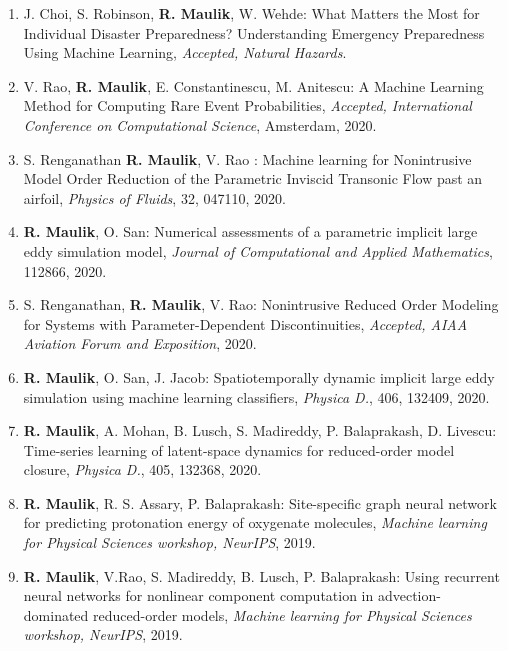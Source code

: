 \documentclass[letterpaper]{article}
\begin{document}
\begin{enumerate}

\item J. Choi, S. Robinson, \textbf{R. Maulik}, W. Wehde: What Matters the Most for Individual Disaster Preparedness? Understanding Emergency Preparedness Using Machine Learning, {\it Accepted, Natural Hazards}.

\item V. Rao, \textbf{R. Maulik}, E. Constantinescu, M. Anitescu: A Machine Learning Method for Computing Rare Event Probabilities, {\it Accepted, International Conference on Computational Science}, Amsterdam, 2020.

\item S. Renganathan \textbf{R. Maulik}, V. Rao : Machine learning for Nonintrusive Model Order Reduction of the Parametric Inviscid Transonic Flow past an airfoil, {\it Physics of Fluids}, 32, 047110, 2020.

\item \textbf{R. Maulik}, O. San: Numerical assessments of a parametric implicit large eddy simulation model, {\it Journal of Computational and Applied Mathematics}, 112866, 2020.

\item S. Renganathan, \textbf{R. Maulik}, V. Rao: Nonintrusive Reduced Order Modeling for Systems with Parameter-Dependent Discontinuities, {\it Accepted, AIAA Aviation Forum and Exposition}, 2020.

\item \textbf{R. Maulik}, O. San, J. Jacob: Spatiotemporally dynamic implicit large eddy simulation using machine learning classifiers, {\it Physica D.}, 406, 132409, 2020.

\item \textbf{R. Maulik}, A. Mohan, B. Lusch, S. Madireddy, P. Balaprakash, D. Livescu: Time-series learning of latent-space dynamics for reduced-order model closure, {\it Physica D.}, 405, 132368, 2020.

\item \textbf{R. Maulik}, R. S. Assary, P. Balaprakash: Site-specific graph neural network for predicting protonation energy of oxygenate molecules, {\it Machine learning for Physical Sciences workshop, NeurIPS}, 2019.

\item \textbf{R. Maulik}, V.Rao, S. Madireddy, B. Lusch, P. Balaprakash: Using recurrent neural networks for nonlinear component computation in advection-dominated reduced-order models, \textit{Machine learning for Physical Sciences workshop, NeurIPS}, 2019.


\end{enumerate}
\end{document}
